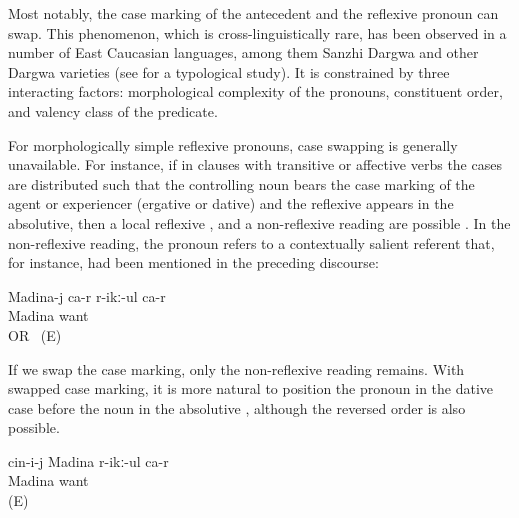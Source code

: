 Most notably, the case marking of the antecedent and the reflexive pronoun can swap. This phenomenon, which is cross-linguistically rare, has been observed in a number of East Caucasian languages, among them Sanzhi Dargwa and other Dargwa varieties (see \citealp{Forker2014} for a typological study). It is constrained by three interacting factors: morphological complexity of the pronouns, constituent order, and valency class of the predicate.

For morphologically simple reflexive pronouns, case swapping is generally unavailable. For instance, if in clauses with transitive or affective verbs the cases are distributed such that the controlling noun bears the case marking of the agent or experiencer (ergative or dative) and the reflexive appears in the absolutive, then a local reflexive ,  and a non-reflexive reading are possible . In the non-reflexive reading, the pronoun refers to a contextually salient referent that, for instance, had been mentioned in the preceding discourse:
%
\begin{exe}
	\ex	\label{ex:Madina likes / wants / loves herself. OR Madina likes / wants / loves her}
	\gll	Madina-j ca-r	r-ikː-ul	ca-r\\
		Madina		want	\\
	\glt	{} OR ~(E)
\end{exe}

If we swap the case marking, only the non-reflexive reading remains. With swapped case marking, it is more natural to position the pronoun in the dative case before the noun in the absolutive , although the reversed order is also possible.
%
\begin{exe}
	\ex	\label{ex:She likes / wants / loves Madina}
	\gll	cin-i-j	Madina r-ikː-ul	ca-r\\
			Madina want	\\
	\glt	{} (E)
\end{exe}

